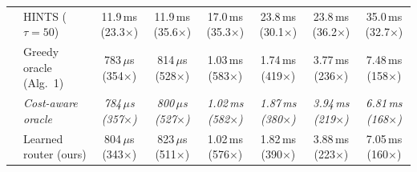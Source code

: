 {\begin{tabular}{llcccccc}
 & HINTS ($\tau{=}50$) & 11.9\,ms (23.3$\times$) & 11.9\,ms (35.6$\times$) & 17.0\,ms (35.3$\times$) & 23.8\,ms (30.1$\times$) & 23.8\,ms (36.2$\times$) & 35.0\,ms (32.7$\times$) \\
 & Greedy oracle (Alg.~1) & 783\,$\mu$s (354$\times$) & 814\,$\mu$s (528$\times$) & 1.03\,ms (583$\times$) & 1.74\,ms (419$\times$) & 3.77\,ms (236$\times$) & 7.48\,ms (158$\times$) \\
 & \textit{Cost-aware oracle} & \textit{784\,$\mu$s (357$\times$)} & \textit{800\,$\mu$s (527$\times$)} & \textit{1.02\,ms (582$\times$)} & \textit{1.87\,ms (380$\times$)} & \textit{3.94\,ms (219$\times$)} & \textit{6.81\,ms (168$\times$)} \\
 & Learned router (ours) & 804\,$\mu$s (343$\times$) & 823\,$\mu$s (511$\times$) & 1.02\,ms (576$\times$) & 1.82\,ms (390$\times$) & 3.88\,ms (223$\times$) & 7.05\,ms (160$\times$) \\
\bottomrule
\end{tabular}}
